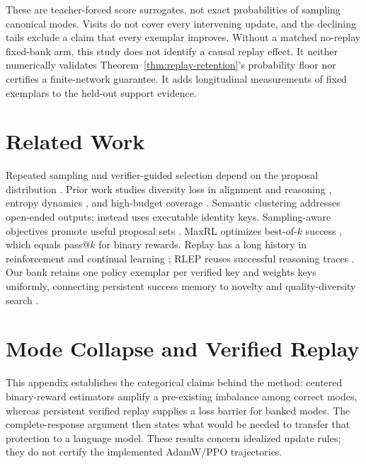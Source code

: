These are teacher-forced score surrogates, not exact probabilities of
sampling canonical modes. Visits do not cover every intervening update,
and the declining tails exclude a claim that every exemplar improves.
Without a matched no-replay fixed-bank arm, this study does not identify
a causal replay effect. It neither numerically validates
Theorem~\ref{thm:replay-retention}'s probability floor nor certifies a finite-network
guarantee. It adds longitudinal measurements of fixed exemplars to the
held-out support evidence.



\section{Related Work}
\label{sec:related}

Repeated sampling and verifier-guided selection depend on the proposal
distribution \citep{brown2024monkeys,snell2024testtime}. Prior work studies
diversity loss in alignment and reasoning \citep{kirk2024understanding,dang2025diversity},
entropy dynamics \citep{cui2025entropy}, and high-budget coverage
\citep{yue2025rlvrlimit}. Semantic clustering \citep{farquhar2024detecting}
addresses open-ended outputs; \mb{} instead uses executable identity keys.
Sampling-aware objectives promote useful proposal sets
\citep{song2025outcome,chen2025passktraining,li2025divergence,li2026setpo,li2026distribution,lochab2026ucpo}.
MaxRL optimizes best-of-$k$ success \citep{tajwar2026maxrl}, which equals
pass@\(k\) for binary rewards. Replay has a long history in reinforcement
and continual learning \citep{lin1992selfimproving,rolnick2019replay}; RLEP
reuses successful reasoning traces \citep{zhang2025rlep}. Our bank retains
one policy exemplar per verified key and weights keys uniformly, connecting
persistent success memory to novelty and quality-diversity search
\citep{lehman2011novelty,mouret2015illuminating}.


\section{Mode Collapse and Verified Replay}
\label{app:theory}

This appendix establishes the categorical claims behind the method: centered
binary-reward estimators amplify a pre-existing imbalance among correct modes,
whereas persistent verified replay supplies a loss barrier for banked modes.
The complete-response argument then states what would be needed to transfer
that protection to a language model. These results concern idealized update
rules; they do not certify the implemented AdamW/PPO trajectories.

